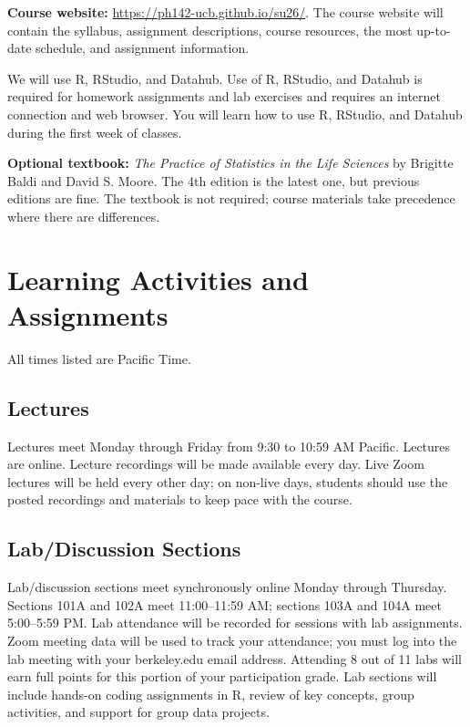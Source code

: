 \documentclass[11pt]{article}
\newcommand{\website}{https://ph142-ucb.github.io/su26/}
\begin{document}
\textbf{Course website:} \href{\website}{\website}. The course website will
contain the syllabus, assignment descriptions, course resources, the most 
up-to-date schedule, and assignment information.

We will use R, RStudio, and Datahub. Use of R, RStudio, and Datahub is required
for homework assignments and lab exercises and requires an internet connection
and web browser. You will learn how to use R, RStudio, and Datahub during the
first week of classes.

\textbf{Optional textbook:} \emph{The Practice of Statistics in the Life
Sciences} by Brigitte Baldi and David S. Moore. The 4th edition is the latest
one, but previous editions are fine. The textbook is not required; course
materials take precedence where there are differences.

\section*{Learning Activities and Assignments}

All times listed are Pacific Time.

\subsection*{Lectures}

Lectures meet Monday through Friday from 9:30 to 10:59 AM Pacific. Lectures are
online. Lecture recordings will be made available every day. Live Zoom lectures
will be held every other day; on non-live days, students should use the posted
recordings and materials to keep pace with the course.

\subsection*{Lab/Discussion Sections}

Lab/discussion sections meet synchronously online Monday through Thursday.
Sections 101A and 102A meet 11:00--11:59 AM; sections 103A and 104A meet
5:00--5:59 PM. Lab attendance will be recorded for sessions with lab assignments.
Zoom meeting data will be used to track your attendance; you must log into the lab
meeting with your berkeley.edu email address. Attending 8 out of 11 labs will earn
full points for this portion of your participation grade. Lab sections will include
hands-on coding assignments in R, review of key concepts, group activities, and 
support for group data projects.
\end{document}

